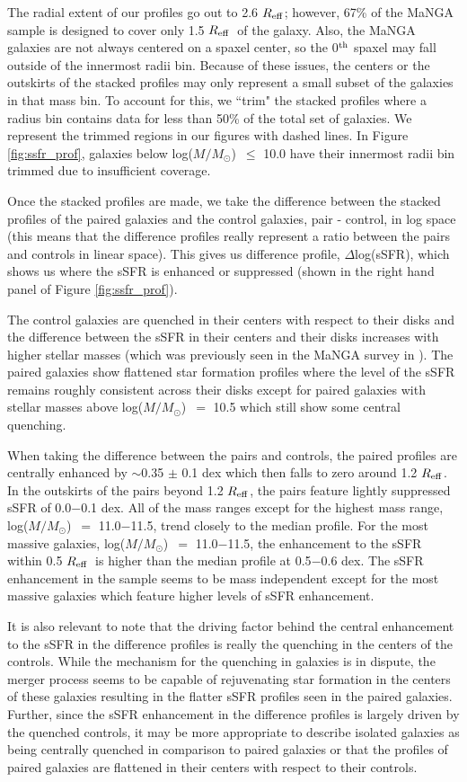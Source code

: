 \documentclass[iop,revtex4,twocolumn,apj,numberedappendix,appendixfloats]{emulateapj}
\newcommand{\reff}{$R_{\rm eff}$}
\newcommand{\logm}{log($M/M_{\odot}$)}
\begin{document}
The radial extent of our profiles go out to 2.6 \reff; however,  67\% of the MaNGA sample is designed to cover only 1.5 \reff\ of the galaxy. Also, the MaNGA galaxies are not always centered on a spaxel center, so the 0$^{\rm th}$ spaxel may fall outside of the innermost radii bin. Because of these issues, the centers or the outskirts of the stacked profiles may only represent a small subset of the galaxies in that mass bin. To account for this, we ``trim" the stacked profiles where a radius bin contains data for less than 50\% of the total set of galaxies. We represent the trimmed regions in our figures with dashed lines. In Figure \ref{fig:ssfr_prof}, galaxies below \logm\ $\le$ 10.0 have their innermost radii bin trimmed due to insufficient coverage.

Once the stacked profiles are made, we take the difference between the stacked profiles of the paired galaxies and the control galaxies, pair - control, in log space (this means that the difference profiles really represent a ratio between the pairs and controls in linear space). This gives us difference profile, $\Delta$log(sSFR), which shows us where the sSFR is enhanced or suppressed (shown in the right hand panel of Figure \ref{fig:ssfr_prof}). 

The control galaxies are quenched in their centers with respect to their disks and the difference between the sSFR in their centers and their disks increases with higher stellar masses (which was previously seen in the MaNGA survey in \citet{Belfiore:2018}). The paired galaxies show flattened star formation profiles where the level of the sSFR remains roughly consistent across their disks except for paired galaxies with stellar masses above \logm\ $=$ 10.5 which still show some central quenching. 

When taking the difference between the pairs and controls, the paired profiles are centrally enhanced by $\sim$0.35 $\pm$ 0.1 dex which then falls to zero around 1.2 \reff. In the outskirts of the pairs beyond 1.2 \reff, the pairs feature lightly suppressed sSFR of 0.0$-$0.1 dex. All of the mass ranges except for the highest mass range, \logm\ $=$ 11.0$-$11.5, trend closely to the median profile. For the most massive galaxies, \logm\ $=$ 11.0$-$11.5, the enhancement to the sSFR within 0.5 \reff\ is higher than the median profile at 0.5$-$0.6 dex. The sSFR enhancement in the sample seems to be mass independent except for the most massive galaxies which feature higher levels of sSFR enhancement.

It is also relevant to note that the driving factor behind the central enhancement to the sSFR in the difference profiles is really the quenching in the centers of the controls. While the mechanism for the quenching in galaxies is in dispute, the merger process seems to be capable of rejuvenating star formation in the centers of these galaxies resulting in the flatter sSFR profiles seen in the paired galaxies. Further, since the sSFR enhancement in the difference profiles is largely driven by the quenched controls, it may be more appropriate to describe isolated galaxies as being centrally quenched in comparison to paired galaxies or that the profiles of paired galaxies are flattened in their centers with respect to their controls. 
\end{document}
